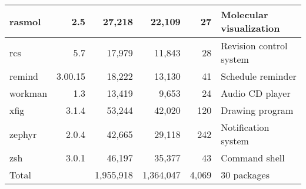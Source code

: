 \begin{tabular}{|l|r|r|r|r|l|}
rasmol & 2.5 & 27,218 & 22,109 & 27 & Molecular visualization\\\hline
rcs & 5.7 & 17,979 & 11,843 & 28 & Revision control system \\\hline
remind & 3.00.15 & 18,222 & 13,130 & 41 & Schedule reminder \\\hline
workman & 1.3 & 13,419 & 9,653 & 24 & Audio CD player \\\hline
xfig & 3.1.4 & 53,244 & 42,020 & 120 & Drawing program \\\hline
zephyr & 2.0.4 & 42,665 & 29,118 & 242 & Notification system \\\hline
zsh & 3.0.1 & 46,197 & 35,377 & 43 & Command shell \\\hline\hline
Total &   & 1,955,918 & 1,364,047 & 4,069 & 30 packages \\\hline
\end{tabular}

